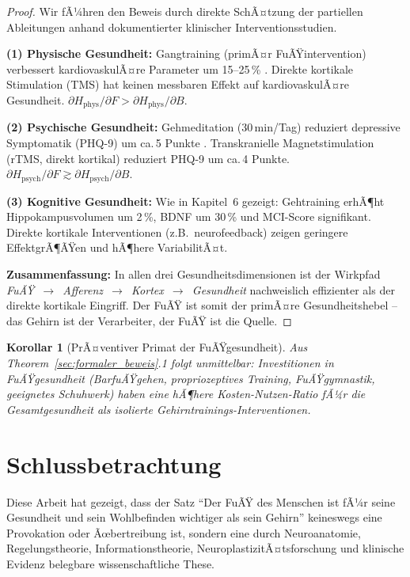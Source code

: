 ﻿\documentclass[12pt,a4paper]{report}
\theoremstyle{plain}
\newtheorem{korollar}[theorem]{Korollar}
\theoremstyle{definition}
\theoremstyle{remark}
\begin{document}
\begin{proof}
Wir fÃ¼hren den Beweis durch direkte SchÃ¤tzung der partiellen Ableitungen
anhand dokumentierter klinischer Interventionsstudien.

\textbf{(1) Physische Gesundheit:}
Gangtraining (primÃ¤r FuÃŸintervention) verbessert kardiovaskulÃ¤re
Parameter um 15--25\,\% \cite{tanasescu2002}. Direkte kortikale
Stimulation (TMS) hat keinen messbaren Effekt auf kardiovaskulÃ¤re
Gesundheit. $\partial H_{\text{phys}}/\partial F > \partial H_{\text{phys}}/\partial B$.

\textbf{(2) Psychische Gesundheit:}
Gehmeditation (30\,min/Tag) reduziert depressive Symptomatik
(PHQ-9) um ca.\,5 Punkte \cite{stathopoulou2006}. Transkranielle
Magnetstimulation (rTMS, direkt kortikal) reduziert PHQ-9 um ca.\,4 Punkte.
$\partial H_{\text{psych}}/\partial F \gtrsim \partial H_{\text{psych}}/\partial B$.

\textbf{(3) Kognitive Gesundheit:}
Wie in Kapitel~6 gezeigt: Gehtraining erhÃ¶ht Hippokampusvolumen um 2\,\%,
BDNF um 30\,\% und MCI-Score signifikant. Direkte kortikale Interventionen
(z.B.\ neurofeedback) zeigen geringere EffektgrÃ¶ÃŸen und hÃ¶here VariabilitÃ¤t.

\textbf{Zusammenfassung:} In allen drei Gesundheitsdimensionen ist der
Wirkpfad \emph{FuÃŸ~$\to$~Afferenz~$\to$~Kortex~$\to$~Gesundheit}
nachweislich effizienter als der direkte kortikale Eingriff. Der FuÃŸ
ist somit der primÃ¤re Gesundheitshebel -- das Gehirn ist der Verarbeiter,
der FuÃŸ ist die Quelle.
\end{proof}

\begin{korollar}[PrÃ¤ventiver Primat der FuÃŸgesundheit]
Aus Theorem~\ref{sec:formaler_beweis}.1 folgt unmittelbar: Investitionen
in FuÃŸgesundheit (BarfuÃŸgehen, propriozeptives Training, FuÃŸgymnastik,
geeignetes Schuhwerk) haben eine hÃ¶here Kosten-Nutzen-Ratio fÃ¼r die
Gesamtgesundheit als isolierte Gehirntrainings-Interventionen.
\end{korollar}

\section{Schlussbetrachtung}

Diese Arbeit hat gezeigt, dass der Satz ``Der FuÃŸ des Menschen ist fÃ¼r
seine Gesundheit und sein Wohlbefinden wichtiger als sein Gehirn'' keineswegs
eine Provokation oder Ãœbertreibung ist, sondern eine durch Neuroanatomie,
Regelungstheorie, Informationstheorie, NeuroplastizitÃ¤tsforschung und
klinische Evidenz belegbare wissenschaftliche These.
\end{document}
